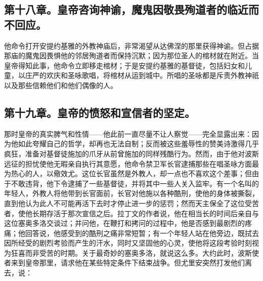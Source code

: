 
\subsection{第十八章。皇帝咨询神谕，魔鬼因敬畏殉道者的临近而不回应。}

他命令打开安提约基雅的外教神庙后，非常渴望从达佛涅的那里获得神谕。但占据那庙的魔鬼因畏惧他的邻居殉道者而保持沉默；因为那位圣人的棺材就在附近。当皇帝得知此事，他命令立即移走棺材；于是安提约基雅的基督徒，包括妇女和儿童，以庄严的欢庆和圣咏歌唱，将棺材从运到城中。所唱的圣咏都是斥责外教神祇以及那些信赖他们和他们偶像的人。\par


\subsection{第十九章。皇帝的愤怒和宣信者的坚定。}

那时皇帝的真实脾气和性情——他此前一直尽量不让人察觉——完全显露出来：因为他如此夸耀自己的哲学，却再也无法自制；反而被这些羞辱性的赞美诗激得几乎疯狂，准备对基督徒施加的爪牙从前曾施加的同样残酷行为。然而，由于他对波斯远征的担忧使他无暇亲自执行其意愿，他命令禁卫军长官逮捕那些在唱圣咏方面最为热心的人，以儆效尤。这位长官虽然是外教人，却一点也不喜欢这个差事；但由于不敢违背，他下令逮捕了一些基督徒，并将其中一些人关入监牢。有一个名叫的年轻人，外教人将他带到长官面前，长官对他施以各种酷刑，使他的身体被撕裂，直到他认为此人不可能再活下去时才停止进一步的惩罚；然而天主保全了这位受苦者，使他长期存活于那次宣信之后。拉丁文的作者说，他在相当长的时间后亲自与这位塞奥多洛交谈过；并问他，在鞭打和拷问的过程中，他是否感到最剧烈的疼痛；他回答说，他感受到的酷刑之痛非常短暂；有一个年轻人站在他旁边，既拭去因所经受的剧烈考验而产生的汗水，同时又坚固他的心灵，使他将这段考验时刻视为狂喜而非受苦的时期。关于最奇妙的塞奥多洛，就说这么多。大约此时，波斯使者来到皇帝那里，请求他在某些特定条件下结束战争。但尤里安突然打发他们离去，说：\par



